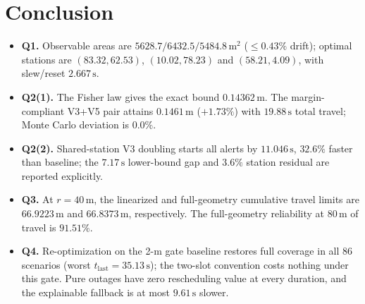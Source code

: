 \section{Conclusion}\label{sec:conclusion}

\begin{itemize}
\item \textbf{Q1.} Observable areas are $5628.7/6432.5/5484.8\,\mathrm{m}^2$
($\le0.43\%$ drift); optimal stations are $(83.32,62.53)$, $(10.02,78.23)$ and
$(58.21,4.09)$, with slew/reset $2.667\,\mathrm{s}$.
\item \textbf{Q2(1).} The Fisher law gives the exact bound $0.14362\,\mathrm{m}$.
The margin-compliant V3+V5 pair attains $0.1461\,\mathrm{m}$ ($+1.73\%$) with
$19.88\,\mathrm{s}$ total travel; Monte Carlo deviation is $0.0\%$.
\item \textbf{Q2(2).} Shared-station V3 doubling starts all alerts by
$11.046\,\mathrm{s}$, $32.6\%$ faster than baseline; the $7.17\,\mathrm{s}$ lower-bound
gap and $3.6\%$ station residual are reported explicitly.
\item \textbf{Q3.} At $r=40\,\mathrm{m}$, the linearized and full-geometry cumulative
travel limits are $66.9223\,\mathrm{m}$ and $66.8373\,\mathrm{m}$, respectively. The
full-geometry reliability at $80\,\mathrm{m}$ of travel is $91.51\%$.
\item \textbf{Q4.} Re-optimization on the 2-m gate baseline restores full coverage in
all 86 scenarios (worst $t_{\mathrm{last}}=35.13\,\mathrm{s}$); the two-slot convention
costs nothing under this gate. Pure outages have zero rescheduling value at every
duration, and the explainable fallback is at most $9.61\,\mathrm{s}$ slower.
\end{itemize}

